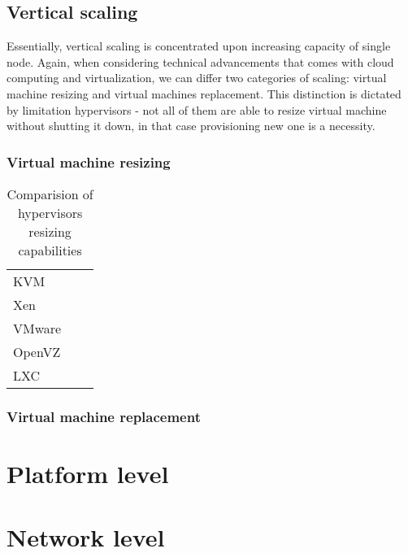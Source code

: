 \subsection{Vertical scaling}

Essentially, vertical scaling is concentrated upon increasing capacity of single node. Again, when considering technical advancements that comes with cloud computing and virtualization, we can differ two categories of scaling: virtual machine resizing and virtual machines replacement. This distinction is dictated by limitation hypervisors - not all of them are able to resize virtual machine without shutting it down, in that case provisioning new one is a necessity.

\subsubsection*{Virtual machine resizing}



\begin{table}[!htbp]
\begin{tabularx}{\textwidth}{l | X | X}
 &  & \\
\hline 
KVM &  & \\
\hline
Xen &  & \\
\hline
VMware &  & \\
\hline
OpenVZ &  & \\
\hline
LXC &  &  \\
\end{tabularx}
\caption{Comparision of hypervisors resizing capabilities}
\label{tab:hypervisors-resizing}
\end{table}

\subsubsection*{Virtual machine replacement}

\section{Platform level}

\section{Network level}
